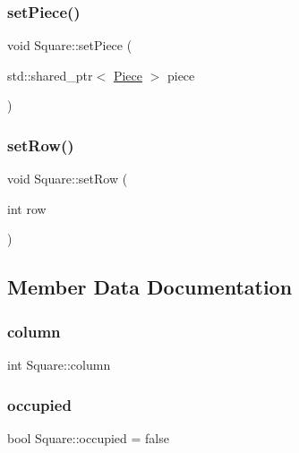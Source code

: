 \mbox{\label{class_square_a2daa860568eaf04bb8bdde747e0c929e}} 
\subsubsection{\texorpdfstring{set\+Piece()}{setPiece()}}
{\footnotesize\ttfamily void Square\+::set\+Piece (\begin{DoxyParamCaption}\item[{std\+::shared\+\_\+ptr$<$ \hyperlink{class_piece}{Piece} $>$}]{piece }\end{DoxyParamCaption})}

\mbox{\label{class_square_a7efdf354c2f71ae95520162743efe170}} 
\subsubsection{\texorpdfstring{set\+Row()}{setRow()}}
{\footnotesize\ttfamily void Square\+::set\+Row (\begin{DoxyParamCaption}\item[{int}]{row }\end{DoxyParamCaption})}



\subsection{Member Data Documentation}
\mbox{\label{class_square_a572fbccc549f148942d85208ce80605f}} 
\subsubsection{\texorpdfstring{column}{column}}
{\footnotesize\ttfamily int Square\+::column\hspace{0.3cm}{\ttfamily [private]}}

\mbox{\label{class_square_ae6af3692dc17a771c296aacf2b40a99e}} 
\subsubsection{\texorpdfstring{occupied}{occupied}}
{\footnotesize\ttfamily bool Square\+::occupied = false\hspace{0.3cm}{\ttfamily [private]}}

